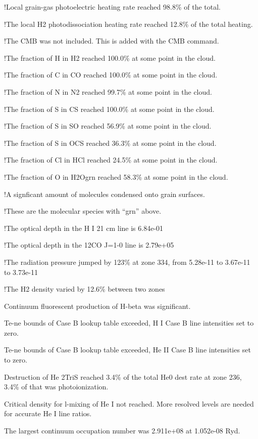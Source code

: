 {  !Local grain-gas photoelectric heating rate reached  98.8\% of the total.

  !The local H2 photodissociation heating rate reached 12.8\% of the total
heating.

  !The CMB was not included.  This is added with the CMB command.

  !The fraction of H  in H2    reached 100.0\% at some point in the cloud.

  !The fraction of C  in CO     reached 100.0\% at some point in the cloud.

  !The fraction of N  in N2     reached 99.7\% at some point in the cloud.

  !The fraction of S  in CS     reached 100.0\% at some point in the cloud.

  !The fraction of S  in SO     reached 56.9\% at some point in the cloud.

  !The fraction of S  in OCS    reached 36.3\% at some point in the cloud.

  !The fraction of Cl in HCl    reached 24.5\% at some point in the cloud.

  !The fraction of O  in H2Ogrn reached 58.3\% at some point in the cloud.

  !A signficant amount of molecules condensed onto grain surfaces.

  !These are the molecular species with ``grn'' above.

  !The optical depth in the H I 21 cm line is 6.84e-01

  !The optical depth in the 12CO J=1-0 line is 2.79e+05

  !The radiation pressure jumped by 123\% at zone 334, from 5.28e-11 to
3.67e-11 to 3.73e-11

  !The H2 density varied by 12.6\% between two zones

   Continuum fluorescent production of H-beta was significant.

   Te-ne bounds of Case B lookup table exceeded, H I Case B line intensities
set to zero.

   Te-ne bounds of Case B lookup table exceeded, He II Case B line
intensities set to zero.

   Destruction of He 2TriS reached 3.4\% of the total He0 dest rate at zone
236, 3.4\% of that was photoionization.

   Critical density for l-mixing of He I not reached.  More resolved levels
are needed for accurate He I line ratios.

   The largest continuum occupation number was 2.911e+08 at 1.052e-08 Ryd.

}
